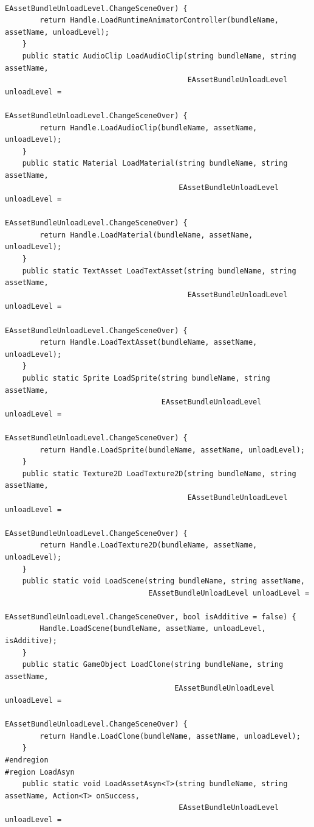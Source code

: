 \documentclass[9pt, b5paper]{article}
\begin{document}
\begin{verbatim}
                                                                          EAssetBundleUnloadLevel.ChangeSceneOver) {
        return Handle.LoadRuntimeAnimatorController(bundleName, assetName, unloadLevel);
    }
    public static AudioClip LoadAudioClip(string bundleName, string assetName, 
                                          EAssetBundleUnloadLevel unloadLevel = 
                                          EAssetBundleUnloadLevel.ChangeSceneOver) {
        return Handle.LoadAudioClip(bundleName, assetName, unloadLevel);
    }
    public static Material LoadMaterial(string bundleName, string assetName, 
                                        EAssetBundleUnloadLevel unloadLevel = 
                                        EAssetBundleUnloadLevel.ChangeSceneOver) {
        return Handle.LoadMaterial(bundleName, assetName, unloadLevel);
    }
    public static TextAsset LoadTextAsset(string bundleName, string assetName, 
                                          EAssetBundleUnloadLevel unloadLevel = 
                                          EAssetBundleUnloadLevel.ChangeSceneOver) {
        return Handle.LoadTextAsset(bundleName, assetName, unloadLevel);
    }
    public static Sprite LoadSprite(string bundleName, string assetName, 
                                    EAssetBundleUnloadLevel unloadLevel = 
                                    EAssetBundleUnloadLevel.ChangeSceneOver) {
        return Handle.LoadSprite(bundleName, assetName, unloadLevel);
    }
    public static Texture2D LoadTexture2D(string bundleName, string assetName, 
                                          EAssetBundleUnloadLevel unloadLevel = 
                                          EAssetBundleUnloadLevel.ChangeSceneOver) {
        return Handle.LoadTexture2D(bundleName, assetName, unloadLevel);
    }
    public static void LoadScene(string bundleName, string assetName, 
                                 EAssetBundleUnloadLevel unloadLevel = 
                                 EAssetBundleUnloadLevel.ChangeSceneOver, bool isAdditive = false) {
        Handle.LoadScene(bundleName, assetName, unloadLevel, isAdditive);
    }
    public static GameObject LoadClone(string bundleName, string assetName, 
                                       EAssetBundleUnloadLevel unloadLevel = 
                                       EAssetBundleUnloadLevel.ChangeSceneOver) {
        return Handle.LoadClone(bundleName, assetName, unloadLevel);
    }
#endregion
#region LoadAsyn
    public static void LoadAssetAsyn<T>(string bundleName, string assetName, Action<T> onSuccess, 
                                        EAssetBundleUnloadLevel unloadLevel = 

\end{verbatim}
\end{document}
